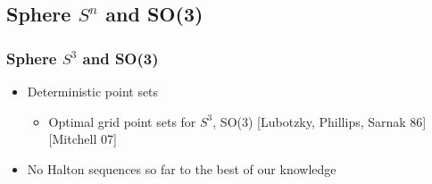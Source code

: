 \documentclass[serif]{beamer} %
\begin{document}
\subsection{Sphere $S^n$ and SO(3)} %
\label{sub:sphere_s_n_and_so_3_}
\begin{frame}
  \frametitle{Sphere $S^3$ and SO(3)}
\begin{itemize}
  \item Deterministic point sets
  \begin{itemize}
    \item Optimal grid point sets for $S^3$, SO(3) [Lubotzky, Phillips, Sarnak 86] [Mitchell 07]
  \end{itemize}
  \item No Halton sequences so far to the best of our knowledge
\end{itemize}
\end{frame}
\end{document}
